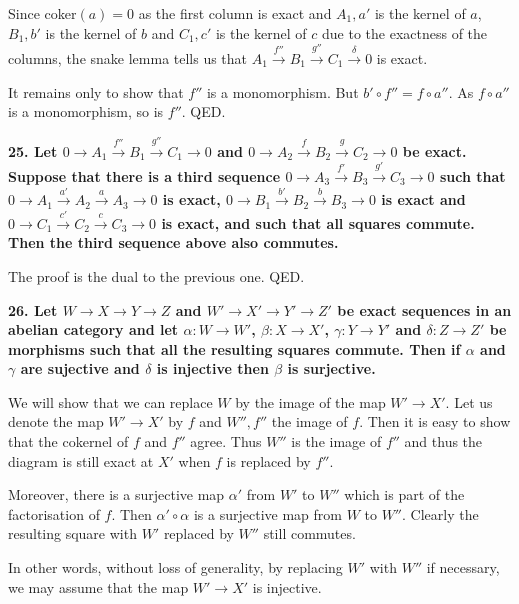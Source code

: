 \documentclass[12pt]{article}
\begin{document}
Since coker$(a) = 0$ as the first column is exact and $A_1, a'$ is the kernel of $a$, $B_1, b'$ is the kernel of $b$ and $C_1, c'$ is the kernel of $c$ due to the exactness of the columns, the snake lemma tells us that $A_1 \overset{f''}{\rightarrow} B_1 \overset{g''}{\rightarrow} C_1 \overset{\delta}{\rightarrow} 0$ is exact.

It remains only to show that $f''$ is a monomorphism. But $b'\circ f'' = f\circ a''$. As $f\circ a''$ is a monomorphism, so is $f''$. QED.

\textbf{25. Let $0 \rightarrow A_1 \overset{f''}{\rightarrow} B_1 \overset{g''}{\rightarrow} C_1 \rightarrow 0$ and $0 \rightarrow A_2 \overset{f}{\rightarrow} B_2 \overset{g}{\rightarrow} C_2 \rightarrow 0$ be exact. Suppose that there is a third sequence $0 \rightarrow A_3 \overset{f'}{\rightarrow} B_3 \overset{g'}{\rightarrow} C_3 \rightarrow 0$ such that $0 \rightarrow A_1 \overset{a'}{\rightarrow} A_2 \overset{a}{\rightarrow} A_3 \rightarrow 0$ is exact, $0 \rightarrow B_1 \overset{b'}{\rightarrow} B_2 \overset{b}{\rightarrow} B_3 \rightarrow 0$ is exact and $0 \rightarrow C_1 \overset{c'}{\rightarrow} C_2 \overset{c}{\rightarrow} C_3 \rightarrow 0$ is exact, and such that all squares commute. Then the third sequence above also commutes.}

The proof is the dual to the previous one. QED.

\textbf{26. Let $W \rightarrow X \rightarrow Y \rightarrow Z$ and $W' \rightarrow X' \rightarrow Y' \rightarrow Z'$ be exact sequences in an abelian category and let $\alpha : W \to W'$, $\beta : X \to X'$, $\gamma : Y \to Y'$ and $\delta : Z \to Z'$ be morphisms such that all the resulting squares commute. Then if $\alpha$ and $\gamma$ are sujective and $\delta$ is injective then $\beta$ is surjective.}

We will show that we can replace $W$ by the image of the map $W' \to X'$. Let us denote the map $W' \to X'$ by $f$ and $W'', f''$ the image of $f$. Then it is easy to show that the cokernel of $f$ and $f''$ agree. Thus $W''$ is the image of $f''$ and thus the diagram is still exact at $X'$ when $f$ is replaced by $f''$.

Moreover, there is a surjective map $\alpha'$ from $W'$ to $W''$ which is part of the factorisation of $f$. Then $\alpha'\circ \alpha$ is a surjective map from $W$ to $W''$. Clearly the resulting square with $W'$ replaced by $W''$ still commutes.

In other words, without loss of generality, by replacing $W'$ with $W''$ if necessary, we may assume that the map $W' \to X'$ is injective.
\end{document}
